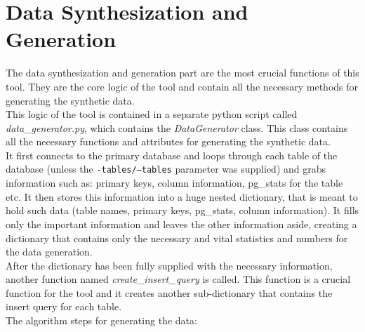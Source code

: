 \section{Data Synthesization and Generation}
The data synthesization and generation part are the most crucial functions of this tool. They are the core logic of the tool and contain all the necessary methods for generating the synthetic data.\\
\newline
This logic of the tool is contained in a separate python script called \textit{data\_generator.py}, which contains the \textit{DataGenerator} class. This class contains all the necessary functions and attributes for generating the synthetic data.\\
It first connects to the primary database and loops through each table of the database (unless the \texttt{-tables/--tables} parameter was supplied) and grabs information such as: primary keys, column information, pg\_stats for the table etc. It then stores this information into a huge nested dictionary, that is meant to hold such data (table names, primary keys, pg\_stats, column information). It fills only the important information and leaves the other information aside, creating a dictionary that contains only the necessary and vital statistics and numbers for the data generation.\\
\newline
After the dictionary has been fully supplied with the necessary information, another function named \textit{create\_insert\_query} is called. This function is a crucial function for the tool and it creates another sub-dictionary that contains the insert query for each table.\\
\newline
The algorithm steps for generating the data:
